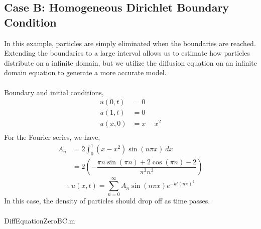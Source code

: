 \documentclass{article}
\begin{document}
\subsection{Case B: Homogeneous Dirichlet Boundary Condition}
In this example, particles are simply eliminated when the boundaries are reached. Extending the boundaries to a large interval allows us to estimate how particles distribute on a infinite domain, but we utilize the diffusion equation on an infinite domain equation to generate a more accurate model.
\\
\\
\noindent Boundary and initial conditions,
\[
	\begin{split}
		u(0,t) &= 0 \\
		u(1,t) &= 0 \\
		u(x,0) &= x-x^2 \\
	\end{split}
\]
For the Fourier series, we have,
\[
	\begin{split}
		A_n &= 2\int_{0}^{1} (x-x^2)\sin{\left(n\pi x\right)} \ dx \\
		&= 2\left(-\dfrac{{\pi}n\sin\left({\pi}n\right)+2\cos\left({\pi}n\right)-2}{{\pi}^3n^3}\right)
	\end{split}
\]
\[
	\therefore \ u(x,t) = \sum^{\infty}_{n=0} A_n\sin{\left(n\pi x\right)}e^{-kt\left(n\pi\right)^2}
\]
In this case, the density of particles should drop off as time passes.
\\
\\
\noindent DiffEquationZeroBC.m
\end{document}
